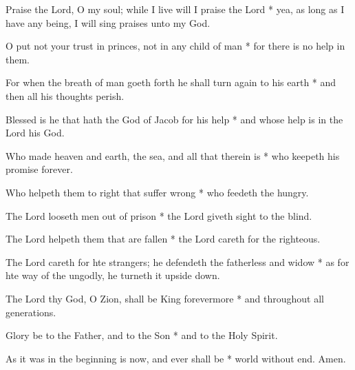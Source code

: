 Praise the Lord, O my soul; while I live will I praise the Lord * yea, as long as I have any being, I will sing praises unto my God.

O put not your trust in princes, not in any child of man * for there is no help in them.
	
For when the breath of man goeth forth he shall turn again to his earth * and then all his thoughts perish.
	
Blessed is he that hath the God of Jacob for his help * and whose help is in the Lord his God.
	
Who made heaven and earth, the sea, and all that therein is * who keepeth his promise forever.
	
Who helpeth them to right that suffer wrong * who feedeth the hungry.
	
The Lord looseth men out of prison * the Lord giveth sight to the blind.
	
The Lord helpeth them that are fallen * the Lord careth for the righteous.
	
The Lord careth for hte strangers; he defendeth the fatherless and widow * as for hte way of the ungodly, he turneth it upside down.
	
The Lord thy God, O Zion, shall be King forevermore * and throughout all generations.
	
Glory be to the Father, and to the Son * and to the Holy Spirit.
	
As it was in the beginning is now, and ever shall be * world without end. Amen.